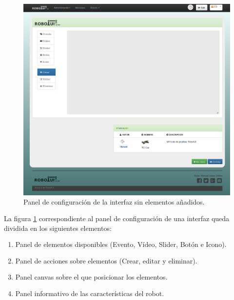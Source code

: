 \begin{figure}[H]
  \begin{center}
    \includegraphics[scale=0.4]{imagenes/manual-usuario/pagina-configurar-interfaz.png}
  \end{center}
  \caption{Panel de configuración de la interfaz sin elementos añadidos.}
  \label{website:configuracion-interfaz}
\end{figure}

La figura \ref{website:configuracion-interfaz} correspondiente al panel de configuración de una interfaz queda dividida en los siguientes elementos:

\begin{enumerate}
  \item Panel de elementos disponibles (Evento, Vídeo, Slider, Botón e Icono).
 \item Panel de acciones sobre elementos (Crear, editar y eliminar).
 \item Panel canvas sobre el que posicionar los elementos.
 \item Panel informativo de las características del robot.
\end{enumerate}


